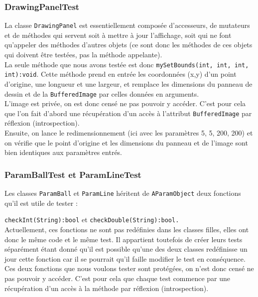 \documentclass{report}
\begin{document}
\subsubsection{DrawingPanelTest}

La classe \texttt{DrawingPanel} est essentiellement composée d’accesseurs, de mutateurs et de méthodes qui servent soit à mettre à jour l’affichage, soit qui ne font qu’appeler des méthodes d’autres objets (ce sont donc les méthodes de ces objets qui doivent être testées, pas la méthode appelante). \\

La seule méthode que nous avons testée est donc \texttt{mySetBounds(int, int, int, int):void}. Cette méthode prend en entrée les coordonnées (x,y) d’un point d’origine, une longueur et une largeur, et remplace les dimensions du panneau de dessin et de la \texttt{BufferedImage} par celles données en arguments. \\

L’image est privée, on est donc censé ne pas pouvoir y accéder. C’est pour cela que l’on fait d’abord une récupération d’un accès à l’attribut \texttt{BufferedImage} par réflexion (introspection). \\

Ensuite, on lance le redimensionnement (ici avec les paramètres 5, 5, 200, 200) et on vérifie que le point d’origine et les dimensions du panneau et de l’image sont bien identiques aux paramètres entrés.

\subsubsection{ParamBallTest et ParamLineTest}

Les classes \texttt{ParamBall} et \texttt{ParamLine} héritent de \texttt{AParamObject} deux fonctions qu’il est utile de tester :

\texttt{checkInt(String):bool} et \texttt{checkDouble(String):bool.} \\

Actuellement, ces fonctions ne sont pas redéfinies dans les classes filles, elles ont donc le même code et le même test. Il appartient toutefois de créer leurs tests séparément étant donné qu’il est possible qu’une des deux classes redéfinisse un jour cette fonction car il se pourrait qu’il faille modifier le test en conséquence. \\

Ces deux fonctions que nous voulons tester sont protégées, on n’est donc censé ne pas pouvoir y accéder. C’est pour cela que chaque test commence par une récupération d’un accès à la méthode par réflexion (introspection).
\end{document}

